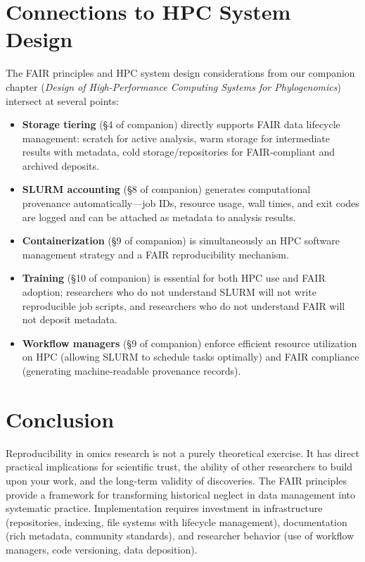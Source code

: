\section{Connections to HPC System Design}

The FAIR principles and HPC system design considerations from our companion chapter (\textit{Design of High-Performance Computing Systems for Phylogenomics}) intersect at several points:

\begin{itemize}
\item \textbf{Storage tiering} (\S{}4 of companion) directly supports FAIR data lifecycle management: scratch for active analysis, warm storage for intermediate results with metadata, cold storage/repositories for FAIR-compliant and archived deposits.

\item \textbf{SLURM accounting} (\S{}8 of companion) generates computational provenance automatically---job IDs, resource usage, wall times, and exit codes are logged and can be attached as metadata to analysis results.

\item \textbf{Containerization} (\S{}9 of companion) is simultaneously an HPC software management strategy and a FAIR reproducibility mechanism.

\item \textbf{Training} (\S{}10 of companion) is essential for both HPC use and FAIR adoption; researchers who do not understand SLURM will not write reproducible job scripts, and researchers who do not understand FAIR will not deposit metadata.

\item \textbf{Workflow managers} (\S{}9 of companion) enforce efficient resource utilization on HPC (allowing SLURM to schedule tasks optimally) and FAIR compliance (generating machine-readable provenance records).
\end{itemize}

\section{Conclusion}

Reproducibility in omics research is not a purely theoretical exercise. It has direct practical implications for scientific trust, the ability of other researchers to build upon your work, and the long-term validity of discoveries. The FAIR principles provide a framework for transforming historical neglect in data management into systematic practice. Implementation requires investment in infrastructure (repositories, indexing, file systems with lifecycle management), documentation (rich metadata, community standards), and researcher behavior (use of workflow managers, code versioning, data deposition).

